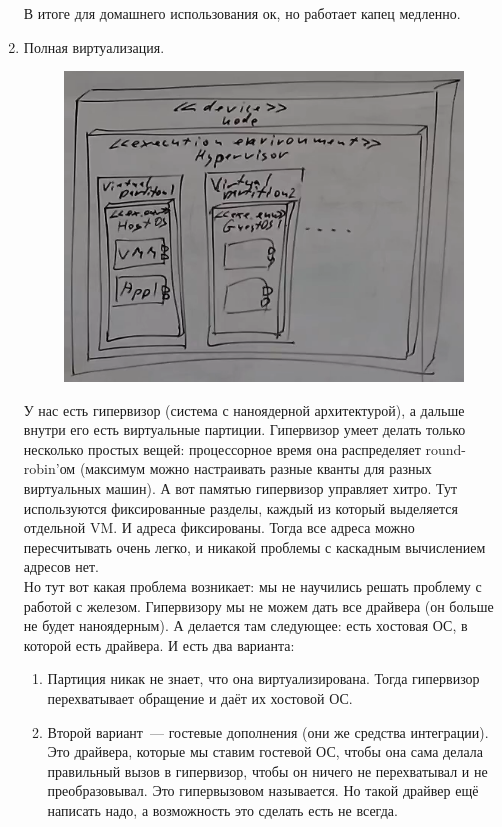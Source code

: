 \documentclass{article}
\begin{document}
\begin{enumerate}
        В итоге для домашнего использования ок, но работает капец медленно.
        \item Полная виртуализация.
        \begin{figure}[H]
            \centering
            \includegraphics[width=0.7\linewidth]{Images/screenshot002}
        \end{figure}\noindent
        У нас есть гипервизор (система с наноядерной архитектурой), а дальше внутри его есть виртуальные партиции. Гипервизор умеет делать только несколько простых вещей: процессорное время она распределяет round-robin'ом (максимум можно настраивать разные кванты для разных виртуальных машин). А вот памятью гипервизор управляет хитро. Тут используются фиксированные разделы, каждый из который выделяется отдельной VM. И адреса фиксированы. Тогда все адреса можно пересчитывать очень легко, и никакой проблемы с каскадным вычислением адресов нет.\\
        Но тут вот какая проблема возникает: мы не научились решать проблему с работой с железом. Гипервизору мы не можем дать все драйвера (он больше не будет наноядерным). А делается там следующее: есть хостовая ОС, в которой есть драйвера. И есть два варианта:
        \begin{enumerate}
            \item Партиция никак не знает, что она виртуализирована. Тогда гипервизор перехватывает обращение и даёт их хостовой ОС.
            \item Второй вариант~--- гостевые дополнения (они же средства интеграции). Это драйвера, которые мы ставим гостевой ОС, чтобы она сама делала правильный вызов в гипервизор, чтобы он ничего не перехватывал и не преобразовывал. Это гипервызовом называется. Но такой драйвер ещё написать надо, а возможность это сделать есть не всегда.
        \end{enumerate}

\end{enumerate}
\end{document}
